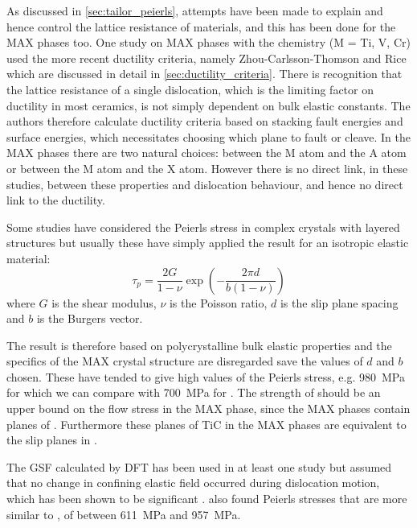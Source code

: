 As discussed in \autoref{sec:tailor_peierls}, attempts have been made to explain and hence control the lattice resistance of materials, and this has been done for the MAX phases too. One study on MAX phases \cite{Music2007ductility} with the chemistry  (M = Ti, V, Cr) used the more recent ductility criteria, namely Zhou-Carlsson-Thomson \cite{Zhou1994} and Rice \cite{Rice1992} which are discussed in detail in \autoref{sec:ductility_criteria}. There is recognition that the lattice resistance of a single dislocation, which is the limiting factor on ductility in most ceramics, is not simply dependent on bulk elastic constants. The authors therefore calculate ductility criteria based on stacking fault energies and surface energies, which necessitates choosing which plane to fault or cleave. In the MAX phases there are two natural choices: between the M atom and the A atom or between the M atom and the X atom. However there is no direct link, in these studies, between these properties and dislocation behaviour, and hence no direct link to the ductility. 

Some studies have considered the Peierls stress in complex crystals with layered structures \cite{Music2008,Emmerlich2009,Gouriet2015} but usually these have simply applied the result for an isotropic elastic material:
\begin{equation}
\tau_p = \frac{2G}{1-\nu} \exp \left( - \frac{2 \pi d}{b(1-\nu)} \right)
\end{equation}
where $G$ is the shear modulus, $\nu$ is the Poisson ratio, $d$ is the slip plane spacing and $b$ is the Burgers vector.


The result is therefore based on polycrystalline bulk elastic properties and the specifics of the MAX crystal structure are disregarded save the values of $d$ and $b$ chosen. These have tended to give high values of the Peierls stress, e.g. \SI{980}{\mega\pascal} for  \cite{Music2008} which we can compare with \SI{700}{\mega\pascal} for  \cite{Clegg2006}. The strength of  should be an upper bound on the flow stress in the MAX phase, since the MAX phases contain planes of . Furthermore these planes of TiC in the MAX phases are equivalent to the slip planes in  \cite{Hollox1966}. 

The GSF calculated by DFT has been used in at least one study \cite{Gouriet2015} but assumed that no change in confining elastic field occurred during dislocation motion, which has been shown to be significant \cite{Lubarda2007,Clegg2006}. \citet{Gouriet2015} also found Peierls stresses that are more similar to , of between \SI{611}{\mega\pascal} and \SI{957}{\mega\pascal}.

